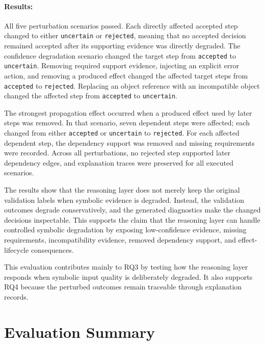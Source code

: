 \paragraph{Results:}
All five perturbation scenarios passed. Each directly affected accepted step
changed to either \texttt{uncertain} or \texttt{rejected}, meaning that no
accepted decision remained accepted after its supporting evidence was directly
degraded. The confidence degradation scenario changed the target step from
\texttt{accepted} to \texttt{uncertain}. Removing required support evidence,
injecting an explicit error action, and removing a produced effect changed the
affected target steps from \texttt{accepted} to \texttt{rejected}. Replacing an
object reference with an incompatible object changed the affected step from
\texttt{accepted} to \texttt{uncertain}.

The strongest propagation effect occurred when a produced effect used by later
steps was removed. In that scenario, seven dependent steps were affected; each
changed from either \texttt{accepted} or \texttt{uncertain} to
\texttt{rejected}. For each affected dependent step, the dependency support was
removed and missing requirements were recorded. Across all perturbations, no
rejected step supported later dependency edges, and explanation traces were
preserved for all executed scenarios.

The results show that the reasoning layer does not merely keep the original
validation labels when symbolic evidence is degraded. Instead, the validation
outcomes degrade conservatively, and the generated diagnostics make the changed
decisions inspectable. This supports the claim that the reasoning layer can
handle controlled symbolic degradation by exposing low-confidence evidence,
missing requirements, incompatibility evidence, removed dependency support, and
effect-lifecycle consequences.

This evaluation contributes mainly to RQ3 by testing how the reasoning layer
responds when symbolic input quality is deliberately degraded. It also supports
RQ4 because the perturbed outcomes remain traceable through explanation records.



\section{Evaluation Summary}
\label{sec:evaluation-summary}

